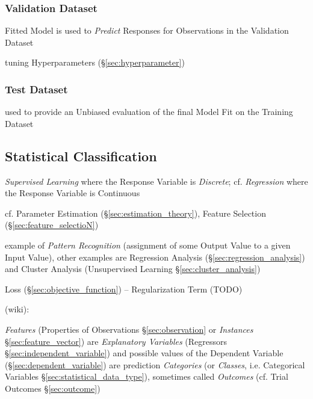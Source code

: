 \subsubsection{Validation Dataset}\label{sec:validation_dataset}

Fitted Model is used to \emph{Predict} Responses for Observations in the
Validation Dataset

tuning Hyperparameters (\S\ref{sec:hyperparameter})



\subsubsection{Test Dataset}\label{sec:test_dataset}

used to provide an Unbiased evaluation of the final Model Fit on the Training
Dataset



\subsection{Statistical Classification}\label{sec:classification}

\emph{Supervised Learning} where the Response Variable is \emph{Discrete}; cf.
\emph{Regression} where the Response Variable is Continuous

cf. Parameter Estimation (\S\ref{sec:estimation_theory}), Feature Selection
(\S\ref{sec:feature_selectioN})

example of \emph{Pattern Recognition} (assignment of some Output Value to a
given Input Value), other examples are Regression Analysis
(\S\ref{sec:regression_analysis}) and Cluster Analysis (Unsupervised Learning
\S\ref{sec:cluster_analysis})

Loss (\S\ref{sec:objective_function}) -- Regularization Term (TODO)

(wiki):

\emph{Features} (Properties of Observations \S\ref{sec:observation} or
\emph{Instances} \S\ref{sec:feature_vector}) are \emph{Explanatory Variables}
(Regressors \S\ref{sec:independent_variable}) and possible values of the
Dependent Variable (\S\ref{sec:dependent_variable}) are prediction
\emph{Categories} (or \emph{Classes}, i.e. Categorical Variables
\S\ref{sec:statistical_data_type}), sometimes called \emph{Outcomes} (cf. Trial
Outcomes \S\ref{sec:outcome})

